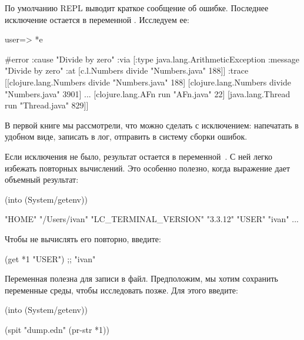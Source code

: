 
По умолчанию REPL выводит краткое сообщение об ошибке. Последнее исключение остается в переменной . Исследуем ее:

\begin{english}
  \begin{clojure}
user=> *e

#error {
 :cause "Divide by zero"
 :via
 [{:type java.lang.ArithmeticException
   :message "Divide by zero"
   :at [c.l.Numbers divide "Numbers.java" 188]}]
 :trace
 [[clojure.lang.Numbers divide "Numbers.java" 188]
  [clojure.lang.Numbers divide "Numbers.java" 3901]
  ...
  [clojure.lang.AFn run "AFn.java" 22]
  [java.lang.Thread run "Thread.java" 829]]}
  \end{clojure}
\end{english}

В первой книге мы рассмотрели, что можно сделать с исключением: напечатать в удобном виде, записать в лог, отправить в систему сборки ошибок.

Если исключения не было, результат остается в переменной~. С ней легко избежать повторных вычислений. Это особенно полезно, когда выражение дает объемный результат:

\begin{english}
  \begin{clojure}
(into {} (System/getenv))

{"HOME" "/Users/ivan"
 "LC_TERMINAL_VERSION" "3.3.12"
 "USER" "ivan"
 ...}
  \end{clojure}
\end{english}

Чтобы не вычислять его повторно, введите:

\begin{english}
  \begin{clojure}
(get *1 "USER")
;; "ivan"
  \end{clojure}
\end{english}

Переменная  полезна для записи в файл. Предположим, мы хотим сохранить переменные среды, чтобы исследовать позже. Для этого введите:

\begin{english}
  \begin{clojure}
(into {} (System/getenv))

(spit "dump.edn" (pr-str *1))
  \end{clojure}
\end{english}

